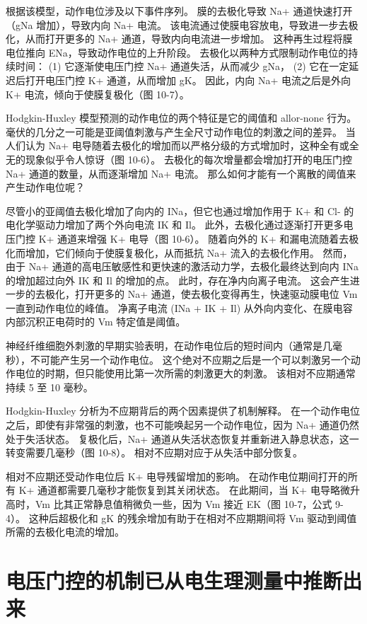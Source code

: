根据该模型，动作电位涉及以下事件序列。 
膜的去极化导致 Na+ 通道快速打开（gNa 增加），导致内向 Na+ 电流。 
该电流通过使膜电容放电，导致进一步去极化，从而打开更多的 Na+ 通道，导致内向电流进一步增加。 
这种再生过程将膜电位推向 ENa，导致动作电位的上升阶段。 
去极化以两种方式限制动作电位的持续时间：
(1) 它逐渐使电压门控 Na+ 通道失活，从而减少 gNa，
(2) 它在一定延迟后打开电压门控 K+ 通道，从而增加 gK。 
因此，内向 Na+ 电流之后是外向 K+ 电流，倾向于使膜复极化（图 10-7）。


Hodgkin-Huxley 模型预测的动作电位的两个特征是它的阈值和 allor-none 行为。 
毫伏的几分之一可能是亚阈值刺激与产生全尺寸动作电位的刺激之间的差异。 
当人们认为 Na+ 电导随着去极化的增加而以严格分级的方式增加时，这种全有或全无的现象似乎令人惊讶（图 10-6）。 
去极化的每次增量都会增加打开的电压门控 Na+ 通道的数量，从而逐渐增加 Na+ 电流。 
那么如何才能有一个离散的阈值来产生动作电位呢？


尽管小的亚阈值去极化增加了向内的 INa，但它也通过增加作用于 K+ 和 Cl- 的电化学驱动力增加了两个外向电流 IK 和 Il。 此外，去极化通过逐渐打开更多电压门控 K+ 通道来增强 K+ 电导（图 10-6）。 
随着向外的 K+ 和漏电流随着去极化而增加，它们倾向于使膜复极化，从而抵抗 Na+ 流入的去极化作用。 
然而，由于 Na+ 通道的高电压敏感性和更快速的激活动力学，去极化最终达到向内 INa 的增加超过向外 IK 和 Il 的增加的点。 
此时，存在净内向离子电流。 
这会产生进一步的去极化，打开更多的 Na+ 通道，使去极化变得再生，快速驱动膜电位 Vm 一直到动作电位的峰值。 
净离子电流 (INa + IK + Il) 从外向内变化、在膜电容内部沉积正电荷时的 Vm 特定值是阈值。


神经纤维细胞外刺激的早期实验表明，在动作电位后的短时间内（通常是几毫秒），不可能产生另一个动作电位。 
这个绝对不应期之后是一个可以刺激另一个动作电位的时期，但只能使用比第一次所需的刺激更大的刺激。 
该相对不应期通常持续 5 至 10 毫秒。


Hodgkin-Huxley 分析为不应期背后的两个因素提供了机制解释。 
在一个动作电位之后，即使有非常强的刺激，也不可能唤起另一个动作电位，因为 Na+ 通道仍然处于失活状态。 
复极化后，Na+ 通道从失活状态恢复并重新进入静息状态，这一转变需要几毫秒（图 10-8）。 
相对不应期对应于从失活中部分恢复。


相对不应期还受动作电位后 K+ 电导残留增加的影响。 
在动作电位期间打开的所有 K+ 通道都需要几毫秒才能恢复到其关闭状态。 
在此期间，当 K+ 电导略微升高时，Vm 比其正常静息值稍微负一些，因为 Vm 接近 EK（图 10-7，公式 9-4）。 
这种后超极化和 gK 的残余增加有助于在相对不应期期间将 Vm 驱动到阈值所需的去极化电流的增加。




\section{电压门控的机制已从电生理测量中推断出来}

